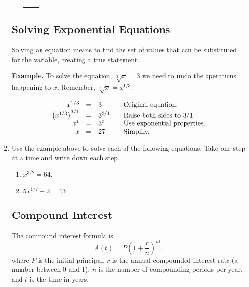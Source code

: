 \begin{enumerate}
\begin{enumerate}
\begin{tabular}{ll}
\begin{minipage}[m]{0.5\linewidth}
\begin{tikzpicture}[y=.6cm, x=.6cm,font=\sffamily,
	mydot/.style={
    circle,
    fill=white,
    draw,
    outer sep=0pt,
    inner sep=1.5pt
  }]
  \end{tikzpicture}
  \end{minipage}
      
  \end{tabular}


\vfill


\end{enumerate}

\clearpage
\subsection{Solving Exponential Equations}
Solving an equation means to find the set of values that can be
substituted for the variable, creating a true statement.


\textbf{Example.} To solve the equation, $\sqrt[3]{x}=3$ we need to
undo the operations happening to $x$.  Remember,
$\sqrt[3]{x}=x^{1/3}$.

\begin{equation*}
  \begin{array}{rcl@{\hspace{2em}}l}
    x^{1/3} & = & 3 & \textrm{Original~equation.}\\
    \left(x^{1/3}\right)^{3/1} & = & 3^{3/1} & \textrm{Raise~both~sides~to~$3/1$.}\\
    x^1 & = & 3^3 & \textrm{Use~exponential~properties.} \\
    x & = & 27    & \textrm{Simplify.}
  \end{array}
\end{equation*}

\item Use the example above to solve each of the following
  equations. Take one step at a time and write down each step.
\begin{enumerate}
\item  $x^{3/2}=64$. 
  \vfill
\item  $5x^{1/7}-2=13$
  \vfill
\end{enumerate}




\clearpage
\subsection{Compound Interest}


\noindent The compound interest formula is
$$A(t)=P\left(1+\frac{r}{n}\right) ^{nt},$$
where $P$ is the initial principal, $r$ is the annual compounded
interest rate (a number between 0 and 1), $n$ is the number of
compounding periods per year, and $t$ is the time in years.


\end{enumerate}
